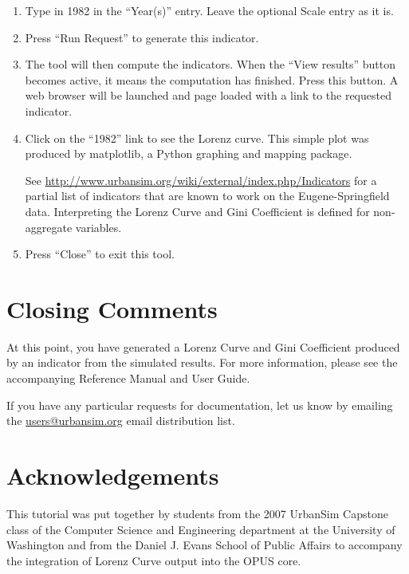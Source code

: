 \documentclass{howto}
\begin{document}
\begin{enumerate}
\item Type in 1982 in the ``Year(s)'' entry. Leave the optional Scale entry as it is.

\item Press ``Run Request'' to generate this indicator.

\item The tool will then compute the indicators. When the
``View results'' button becomes active, it means the computation has finished.
Press this button. A web
browser will be launched and page loaded with a link to the requested indicator.

\item Click on the ``1982'' link to see the Lorenz curve. This simple plot was
produced by matplotlib, a Python graphing and mapping package.  


See \url{http://www.urbansim.org/wiki/external/index.php/Indicators} for a
partial list of indicators that are known to work on the Eugene-Springfield
data.  Interpreting the Lorenz Curve and Gini Coefficient is defined for non-aggregate
variables.  

\item Press ``Close'' to exit this tool.

\end{enumerate}

\section*{Closing Comments}

At this point, you have generated a Lorenz Curve and Gini Coefficient 
produced by an indicator from the simulated results. 
For more information, please see the accompanying Reference Manual and User Guide. 

If you have any particular requests for documentation, let us know by emailing
the \url{users@urbansim.org} email distribution list.

\section*{Acknowledgements}

This tutorial was put together by students from the 2007 UrbanSim Capstone class of the Computer
Science and Engineering department at the University of Washington
and from the Daniel J. Evans School of Public Affairs to accompany the integration
of Lorenz Curve output into the OPUS core.
\end{document}
